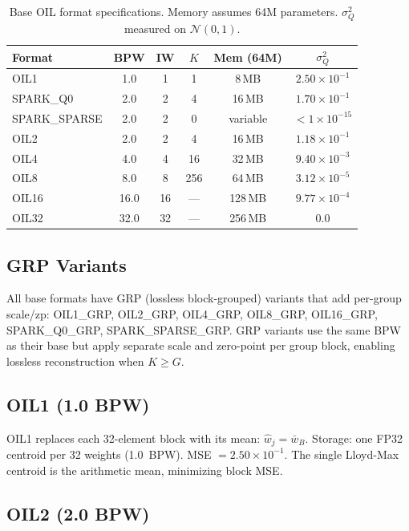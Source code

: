 \begin{table}[htbp]
\centering
\caption{Base OIL format specifications. Memory assumes 64M parameters.
$\sigma_Q^2$ measured on $\mathcal{N}(0,1)$.}
\label{tab:base_formats}
\begin{tabular}{lccccc}
\toprule
\textbf{Format} & \textbf{BPW} & \textbf{IW} & \textbf{$K$} &
\textbf{Mem (64M)} & \textbf{$\sigma_Q^2$} \\
\midrule
OIL1       & 1.0  & 1  & 1    & 8\,MB   & $2.50 \times 10^{-1}$ \\
SPARK\_Q0  & 2.0  & 2  & 4    & 16\,MB  & $1.70 \times 10^{-1}$ \\
SPARK\_SPARSE & 2.0 & 2 & 0  & variable & $<1 \times 10^{-15}$ \\
OIL2       & 2.0  & 2  & 4    & 16\,MB  & $1.18 \times 10^{-1}$ \\
OIL4       & 4.0  & 4  & 16   & 32\,MB  & $9.40 \times 10^{-3}$ \\
OIL8       & 8.0  & 8  & 256  & 64\,MB  & $3.12 \times 10^{-5}$ \\
OIL16      & 16.0 & 16 & ---  & 128\,MB & $9.77 \times 10^{-4}$ \\
OIL32      & 32.0 & 32 & ---  & 256\,MB & 0.0 \\
\bottomrule
\end{tabular}
\end{table}

\subsection{GRP Variants}

All base formats have GRP (lossless block-grouped) variants that add per-group scale/zp:
OIL1\_GRP, OIL2\_GRP, OIL4\_GRP, OIL8\_GRP, OIL16\_GRP, SPARK\_Q0\_GRP, SPARK\_SPARSE\_GRP.
GRP variants use the same BPW as their base but apply separate scale and zero-point
per group block, enabling lossless reconstruction when $K \geq G$.

\subsection{OIL1 (1.0 BPW)}

OIL1 replaces each 32-element block with its mean:
$\hat{w}_j = \bar{w}_B$. Storage: one FP32 centroid per 32 weights
(1.0~BPW). MSE $= 2.50 \times 10^{-1}$. The single Lloyd-Max centroid
is the arithmetic mean, minimizing block MSE.

\subsection{OIL2 (2.0 BPW)}

